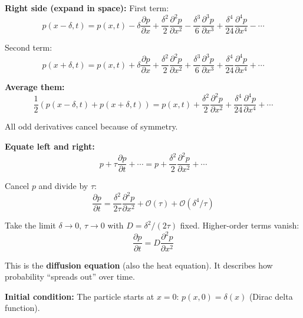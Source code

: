 \documentclass[11pt,a4paper]{article}
\begin{document}
	\textbf{Right side (expand in space):}
	First term:
	\begin{equation}
		p(x-\delta, t) = p(x,t) - \delta \frac{\partial p}{\partial x} + \frac{\delta^2}{2} \frac{\partial^2 p}{\partial x^2} - \frac{\delta^3}{6} \frac{\partial^3 p}{\partial x^3} + \frac{\delta^4}{24} \frac{\partial^4 p}{\partial x^4} - \cdots
	\end{equation}
	
	Second term:
	\begin{equation}
		p(x+\delta, t) = p(x,t) + \delta \frac{\partial p}{\partial x} + \frac{\delta^2}{2} \frac{\partial^2 p}{\partial x^2} + \frac{\delta^3}{6} \frac{\partial^3 p}{\partial x^3} + \frac{\delta^4}{24} \frac{\partial^4 p}{\partial x^4} + \cdots
	\end{equation}
	
	\textbf{Average them:}
	\begin{equation}
		\frac{1}{2}\left(p(x-\delta,t) + p(x+\delta,t)\right) = p(x,t) + \frac{\delta^2}{2} \frac{\partial^2 p}{\partial x^2} + \frac{\delta^4}{24} \frac{\partial^4 p}{\partial x^4} + \cdots
	\end{equation}
	
	All odd derivatives cancel because of symmetry.
	
	\textbf{Equate left and right:}
	\begin{equation}
		p + \tau \frac{\partial p}{\partial t} + \cdots = p + \frac{\delta^2}{2} \frac{\partial^2 p}{\partial x^2} + \cdots
	\end{equation}
	
	Cancel $p$ and divide by $\tau$:
	\begin{equation}
		\frac{\partial p}{\partial t} = \frac{\delta^2}{2\tau} \frac{\partial^2 p}{\partial x^2} + \mathcal{O}(\tau) + \mathcal{O}(\delta^4/\tau)
	\end{equation}
	
	Take the limit $\delta \to 0$, $\tau \to 0$ with $D = \delta^2 / (2\tau)$ fixed. Higher-order terms vanish:
	\begin{equation}
		\boxed{\frac{\partial p}{\partial t} = D \frac{\partial^2 p}{\partial x^2}}
	\end{equation}
	
	This is the \textbf{diffusion equation} (also the heat equation). It describes how probability ``spreads out'' over time.
	
	\textbf{Initial condition:} The particle starts at $x=0$: $p(x,0) = \delta(x)$ (Dirac delta function).
	
\end{document}

